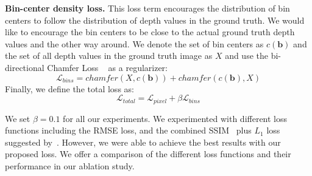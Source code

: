 \documentclass[final]{cvpr}
\begin{document}
\textbf{Bin-center density loss.} This loss term encourages the distribution of bin centers to follow the distribution of depth values in the ground truth. We would like to encourage the bin centers to be close to the actual ground truth depth values and the other way around. We denote the set of bin centers as $c(\textbf{b})$ and the set of all depth values in the ground truth image as $X$ and use the bi-directional Chamfer Loss ~\cite{Fan2017_chamfer_loss} as a regularizer:
%
\begin{equation}
    \mathcal{L}_{bins} = chamfer(X, c(\textbf{b})) + chamfer(c(\textbf{b}), X)
    \label{eq:chamfer-loss}
\end{equation}
%
Finally, we define the total loss as:
%
\begin{equation}
    \mathcal{L}_{total} = \mathcal{L}_{pixel} + \beta \mathcal{L}_{bins}
\end{equation}

We set $\beta = 0.1$ for all our experiments. We experimented with different loss functions including the RMSE loss, and the combined SSIM~\cite{Wang2004SSIM} plus $L_1$ loss suggested by~\cite{Alhashim2018}. However, we were able to achieve the best results with our proposed loss. We offer a comparison of the different loss functions and their performance in our ablation study.
\end{document}
